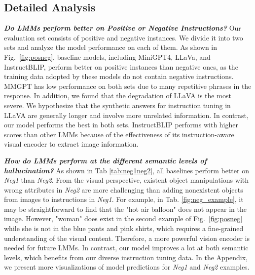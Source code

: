 





\subsection{Detailed Analysis}
\textbf{\textit{Do LMMs perform better on Positive or Negative Instructions? }}Our evaluation set consists of positive and negative instances. We divide it into two sets and analyze the model performance on each of them. As shown in Fig.~\ref{fig:posneg}, baseline models, including MiniGPT4, LLaVa, and InstructBLIP,  perform better on positive instances than negative ones, as the training data adopted by these models do not contain negative instructions. MMGPT has low performance on both sets due to many repetitive phrases in the response. In addition, we found that the degradation of LLaVA is the most severe. We hypothesize that the synthetic answers for instruction tuning in LLaVA are generally longer and involve more unrelated information. In contrast, our model performs the best in both sets. InstructBLIP performs with higher scores than other LMMs because of the effectiveness of its instruction-aware visual encoder to extract image information.



\textbf{\textit{How do LMMs perform at the different semantic levels of hallucination? }} As shown in Tab \ref{tab:neg1neg2}, all baselines perform better on \textit{Neg1} than \textit{Neg2}. From the visual perspective, existent object manipulations with wrong attributes in \textit{Neg2} are more challenging than adding nonexistent objects from images to instructions in \textit{Neg1}. For example, in Tab. \ref{fig:neg_example}, it %
may be straightforward to find that the "hot air balloon" does not appear in the image. However, "woman" does exist in the second example of Fig.~\ref{fig:posneg} while she is not in the blue pants and pink shirts, which requires a fine-grained understanding of the visual content. Therefore, a more powerful vision encoder is needed for future LMMs. In contrast, our model improves a lot at both semantic levels, which benefits from our diverse instruction tuning data. In the Appendix, we present more visualizations of model predictions for \textit{Neg1} and  \textit{Neg2} examples. %

